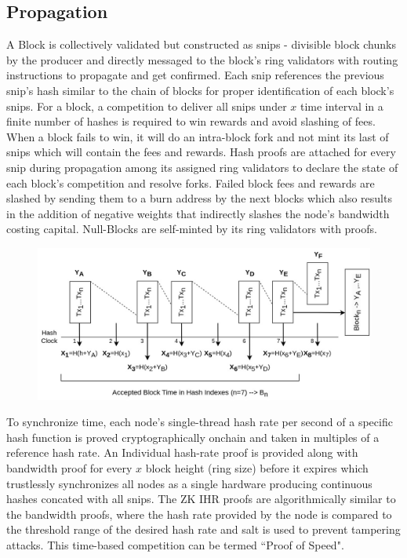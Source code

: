 \documentclass[a4paper, 10pt]{extarticle}
\begin{document}
\subsection{Propagation}
A Block is collectively validated but constructed as snips - divisible block chunks by the producer and directly messaged to the block's ring validators with routing instructions to propagate and get confirmed. Each snip references the previous snip's hash similar to the chain of blocks for proper identification of each block's snips. For a block, a competition to deliver all snips under $x$ time interval in a finite number of hashes is required to win rewards and avoid slashing of fees. When a block fails to win, it will do an intra-block fork and not mint its last of snips which will contain the fees and rewards. Hash proofs are attached for every snip during propagation among its assigned ring validators to declare the state of each block's competition and resolve forks. Failed block fees and rewards are slashed by sending them to a burn address by the next blocks which also results in the addition of negative weights that indirectly slashes the node's bandwidth costing capital. Null-Blocks are self-minted by its ring validators with proofs.\\
\begin{figure}[H]
\begin{center}
\includegraphics[width=12cm]{Snips}
\end{center}
\end{figure}
To synchronize time, each node's single-thread hash rate per second of a specific hash function is proved cryptographically onchain and taken in multiples of a reference hash rate. An Individual hash-rate proof is provided along with bandwidth proof for every $x$ block height (ring size) before it expires which trustlessly synchronizes all nodes as a single hardware producing continuous hashes concated with all snips. The ZK IHR proofs are algorithmically similar to the bandwidth proofs, where the hash rate provided by the node is compared to the threshold range of the desired hash rate and salt is used to prevent tampering attacks. This time-based competition can be termed ``Proof of Speed".
\end{document}
